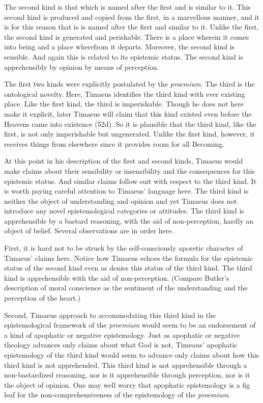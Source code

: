 The second kind is that which is named after the first and is similar to it. This second kind is produced and copied from the first, in a marvellous manner, and it is for this reason that is is named after the first and similar to it. Unlike the first, the second kind is generated and perishable. There is a place wherein it comes into being and a place wherefrom it departs. Moreover, the second kind is sensible. And again this is related to its epistemic status. The second kind is apprehensibly by opinion by means of perception. 

The first two kinds were explicitly postulated by the \emph{proemium}. The third is the ontological novelty. Here, Timaeus identifies the third kind with ever existing place. Like the first kind, the third is imperishable. Though he does not here make it explicit, later Timaeus will claim that this kind existed even before the Heavens came into existence (52d). So it is plausible that the third kind, like the first, is not only imperishable but ungenerated. Unlike the first kind, however, it receives things from elsewhere since it provides room for all Becoming.

At this point in his description of the first and second kinds, Timaeus would make claims about their sensibility or insensibility and the consequences for this epistemic status. And similar claims follow suit with respect to the third kind. It is worth paying careful attention to Timaeus' language here. The third kind is neither the object of understanding and opinion and yet Timaeus does not introduce any novel epistemological categories or attitudes. The third kind is apprehensible by a bastard reasoning, with the aid of non-perception, hardly an object of belief. Several observations are in order here.

First, it is hard not to be struck by the self-consciously aporetic character of Timaeus' claims here. Notice how Timaeus echoes the formula for the epistemic status of the second kind even as denies this status of the third kind. The third kind is apprehensible with the aid of non-perception. (Compare Butler's description of moral conscience as the sentiment of the understanding and the perception of the heart.) 

Second, Timaeus approach to accommodating this third kind in the epistemological framework of the \emph{proemium} would seem to be an endorsement of a kind of apophatic or negative epistemology. Just as apophatic or negative theology advances only claims about what God is not, Timeaus' apophatic epistemology of the third kind would seem to advance only claims about how this third kind is not apprehended. This third kind is not apprehensible through a non-bastardized reasoning, nor is it apprehensible through perception, nor is it the object of opinion. One may well worry that apophatic epistemology is a fig leaf for the non-comprehensiveness of the epistemology of the \emph{proemium}.

